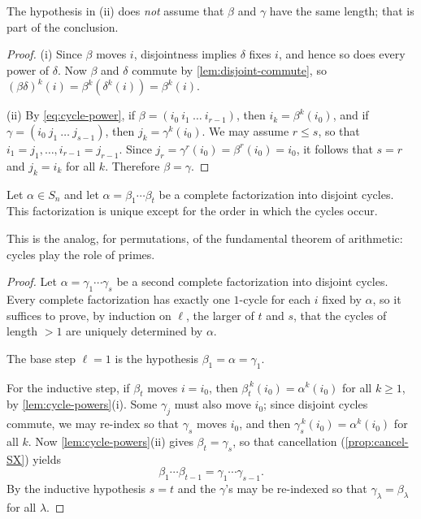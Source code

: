 \begin{remark}
	The hypothesis in (ii) does \emph{not} assume that \(\beta\) and \(\gamma\) have the
	same length; that is part of the conclusion.
\end{remark}

\begin{proof}
	(i) Since \(\beta\) moves \(i\), disjointness implies \(\delta\) fixes \(i\), and hence
	so does every power of \(\delta\). Now \(\beta\) and \(\delta\) commute by
	\autoref{lem:disjoint-commute}, so
	\((\beta\delta)^k(i) = \beta^k(\delta^k(i)) = \beta^k(i)\).

	(ii) By \eqref{eq:cycle-power}, if \(\beta = (i_0\ i_1\ \dots\ i_{r-1})\), then
	\(i_k = \beta^k(i_0)\), and if \(\gamma = (i_0\ j_1\ \dots\ j_{s-1})\), then
	\(j_k = \gamma^k(i_0)\). We may assume \(r \leq s\), so that
	\(i_1 = j_1, \dots, i_{r-1} = j_{r-1}\). Since
	\(j_r = \gamma^r(i_0) = \beta^r(i_0) = i_0\), it follows that \(s = r\) and
	\(j_k = i_k\) for all \(k\). Therefore \(\beta = \gamma\).
\end{proof}

\begin{theorem}\label{thm:unique-factorization}
	Let \(\alpha \in S_n\) and let \(\alpha = \beta_1 \cdots \beta_t\) be a complete
	factorization into disjoint cycles. This factorization is unique except for the order in
	which the cycles occur.
\end{theorem}

\begin{intuition}
	This is the analog, for permutations, of the fundamental theorem of arithmetic: cycles
	play the role of primes.
\end{intuition}

\begin{proof}
	Let \(\alpha = \gamma_1 \cdots \gamma_s\) be a second complete factorization into
	disjoint cycles. Every complete factorization has exactly one \(1\)-cycle for each \(i\)
	fixed by \(\alpha\), so it suffices to prove, by induction on \(\ell\), the larger of
	\(t\) and \(s\), that the cycles of length \(> 1\) are uniquely determined by \(\alpha\).

	The base step \(\ell = 1\) is the hypothesis \(\beta_1 = \alpha = \gamma_1\).

	For the inductive step, if \(\beta_t\) moves \(i = i_0\), then
	\(\beta_t^{\,k}(i_0) = \alpha^k(i_0)\) for all \(k \geq 1\), by
	\autoref{lem:cycle-powers}(i). Some \(\gamma_j\) must also move \(i_0\); since disjoint
	cycles commute, we may re-index so that \(\gamma_s\) moves \(i_0\), and then
	\(\gamma_s^{\,k}(i_0) = \alpha^k(i_0)\) for all \(k\). Now
	\autoref{lem:cycle-powers}(ii) gives \(\beta_t = \gamma_s\), so that cancellation
	(\autoref{prop:cancel-SX}) yields
	\[
		\beta_1 \cdots \beta_{t-1} = \gamma_1 \cdots \gamma_{s-1}.
	\]
	By the inductive
	hypothesis \(s = t\) and the \(\gamma\)'s may be re-indexed so that
	\(\gamma_\lambda = \beta_\lambda\) for all \(\lambda\).
\end{proof}

